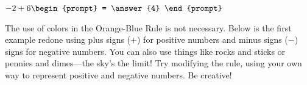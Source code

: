 \documentclass{ximera}[font=12pt]
\begin{document}
\begin{problem}
\begin{center}
\end{center}

$-2 + 6 \begin{prompt} =  \answer{4} \end{prompt}$

\end{problem}

The use of colors in the Orange-Blue Rule is not necessary. Below is the first example redone using plus signs ($+$) for 
positive numbers and minus signs ($-$) signs for negative numbers.  You can also use things like rocks and sticks or
pennies and dimes---the sky's the limit!  Try modifying the rule, using your own way to represent positive and negative 
numbers.  Be creative!
\end{document}
